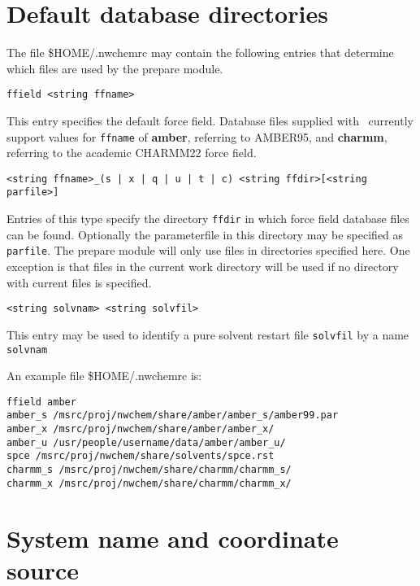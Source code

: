 \section{Default database directories}

The file \$HOME/.nwchemrc may contain the following entries that determine
which files are used by the prepare module.

\begin{verbatim}
ffield <string ffname>
\end{verbatim}

This entry specifies the default force field. Database files supplied with
\nwchem\ currently support values for \verb+ffname+ of {\bf amber}, referring 
to AMBER95, and {\bf charmm}, referring to the academic CHARMM22 force field.

\begin{verbatim}
<string ffname>_(s | x | q | u | t | c) <string ffdir>[<string parfile>]
\end{verbatim}

Entries of this type specify the directory \verb+ffdir+ in which force field 
database files can be found. Optionally the parameterfile in this directory
may be specified as \verb+parfile+. 
The prepare module will only use files in directories
specified here. One exception is that files in the current work directory
will be used if no directory with current files is specified.

\begin{verbatim}
<string solvnam> <string solvfil>
\end{verbatim}

This entry may be used to identify a pure solvent restart file \verb+solvfil+
by a name \verb+solvnam+

An example file \$HOME/.nwchemrc is:

\begin{verbatim}
ffield amber
amber_s /msrc/proj/nwchem/share/amber/amber_s/amber99.par
amber_x /msrc/proj/nwchem/share/amber/amber_x/
amber_u /usr/people/username/data/amber/amber_u/
spce /msrc/proj/nwchem/share/solvents/spce.rst
charmm_s /msrc/proj/nwchem/share/charmm/charmm_s/
charmm_x /msrc/proj/nwchem/share/charmm/charmm_x/
\end{verbatim}

\section{System name and coordinate source}

